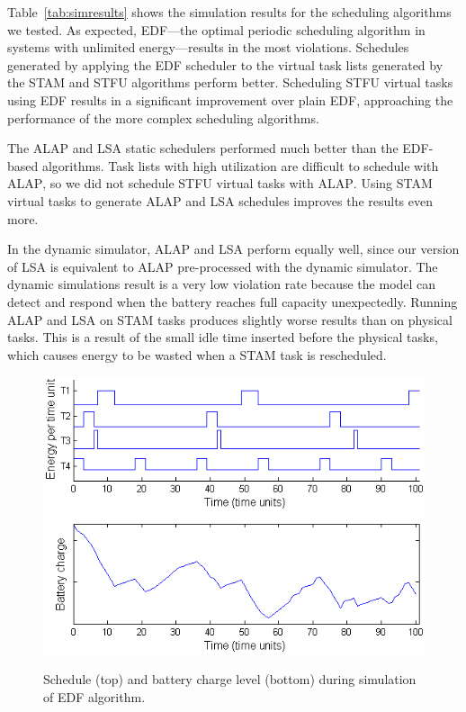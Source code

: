 Table~\ref{tab:simresults} shows the simulation results for the scheduling algorithms we tested.  As expected, \textsc{EDF}---the optimal periodic scheduling algorithm in systems with unlimited energy---results in the most violations.  Schedules generated by applying the \textsc{EDF} scheduler to the virtual task lists generated by the \textsc{STAM} and \textsc{STFU} algorithms perform better.  Scheduling \textsc{STFU} virtual tasks using \textsc{EDF} results in a significant improvement over plain \textsc{EDF}, approaching the performance of the more complex scheduling algorithms.

The \textsc{ALAP} and \textsc{LSA} static schedulers performed much better than the \textsc{EDF}-based algorithms.  Task lists with high utilization are difficult to schedule with \textsc{ALAP}, so we did not schedule \textsc{STFU} virtual tasks with \textsc{ALAP}.  Using \textsc{STAM} virtual tasks to generate \textsc{ALAP} and \textsc{LSA} schedules improves the results even more.

In the dynamic simulator, \textsc{ALAP} and \textsc{LSA} perform equally well, since our version of \textsc{LSA} is equivalent to \textsc{ALAP} pre-processed with the dynamic simulator.  The dynamic simulations result is a very low violation rate because the model can detect and respond when the battery reaches full capacity unexpectedly.  Running \textsc{ALAP} and \textsc{LSA} on \textsc{STAM} tasks produces slightly worse results than on physical tasks.  This is a result of the small idle time inserted before the physical tasks, which causes energy to be wasted when a \textsc{STAM} task is rescheduled.

\begin{figure}
\begin{center}
\includegraphics[scale=0.57]{edfbattery.png}
\label{fig:edfbattery}
\caption{Schedule (top) and battery charge level (bottom) during simulation of EDF algorithm.}
\end{center}
\end{figure}

